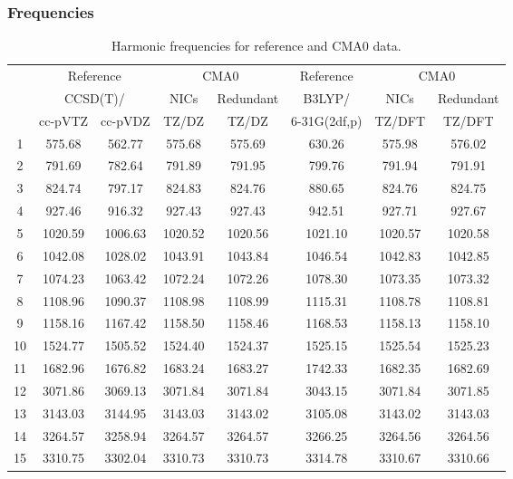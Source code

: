 \documentclass[10pt,oneside]{article}
\begin{document}
\begin{table}[h!]
\subsubsection*{Frequencies}
\centering
\caption{Harmonic frequencies for reference and CMA0 data.}
\begin{tabular}{cccccccc}
\toprule
{} & \multicolumn{2}{c}{Reference} & \multicolumn{2}{c}{CMA0} &    Reference & \multicolumn{2}{c}{CMA0} \\
{} & \multicolumn{2}{c}{CCSD(T)/} &    NICs &  Redundant &       B3LYP/ &    NICs & Redundant \\
{} &   cc-pVTZ & cc-pVDZ &   TZ/DZ &      TZ/DZ & 6-31G(2df,p) &  TZ/DFT &    TZ/DFT \\
\midrule
1  &    575.68 &  562.77 &  575.68 &     575.69 &       630.26 &  575.98 &    576.02 \\
2  &    791.69 &  782.64 &  791.89 &     791.95 &       799.76 &  791.94 &    791.91 \\
3  &    824.74 &  797.17 &  824.83 &     824.76 &       880.65 &  824.76 &    824.75 \\
4  &    927.46 &  916.32 &  927.43 &     927.43 &       942.51 &  927.71 &    927.67 \\
5  &   1020.59 & 1006.63 & 1020.52 &    1020.56 &      1021.10 & 1020.57 &   1020.58 \\
6  &   1042.08 & 1028.02 & 1043.91 &    1043.84 &      1046.54 & 1042.83 &   1042.85 \\
7  &   1074.23 & 1063.42 & 1072.24 &    1072.26 &      1078.30 & 1073.35 &   1073.32 \\
8  &   1108.96 & 1090.37 & 1108.98 &    1108.99 &      1115.31 & 1108.78 &   1108.81 \\
9  &   1158.16 & 1167.42 & 1158.50 &    1158.46 &      1168.53 & 1158.13 &   1158.10 \\
10 &   1524.77 & 1505.52 & 1524.40 &    1524.37 &      1525.15 & 1525.54 &   1525.23 \\
11 &   1682.96 & 1676.82 & 1683.24 &    1683.27 &      1742.33 & 1682.35 &   1682.69 \\
12 &   3071.86 & 3069.13 & 3071.84 &    3071.84 &      3043.15 & 3071.84 &   3071.85 \\
13 &   3143.03 & 3144.95 & 3143.03 &    3143.02 &      3105.08 & 3143.02 &   3143.03 \\
14 &   3264.57 & 3258.94 & 3264.57 &    3264.57 &      3266.25 & 3264.56 &   3264.56 \\
15 &   3310.75 & 3302.04 & 3310.73 &    3310.73 &      3314.78 & 3310.67 &   3310.66 \\
\bottomrule
\end{tabular}
\end{table}
\end{document}
